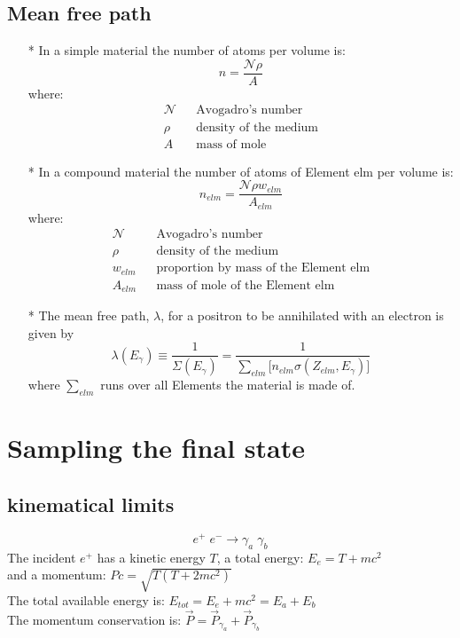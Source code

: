 \subsection{Mean free path}
\begin{itemize}
\item[*]
         In a simple material the number of atoms per volume is:
         \[n  = \frac{\mathcal{N}\rho}{A}\]
         where:
         \begin{eqnarray*}
          \mathcal{N} &  & \mbox{Avogadro's number} \\
          \rho        &  & \mbox{density of the medium} \\
          A           &  & \mbox{mass of mole} 
         \end{eqnarray*}
\item[*]
         In a compound material the number of atoms of Element elm per volume is:
         \[n_{elm}  = \frac{\mathcal{N}\rho w_{elm}}{A_{elm}}\]
         where:
         \begin{eqnarray*}
          \mathcal{N} &  & \mbox{Avogadro's number} \\
          \rho        &  & \mbox{density of the medium} \\
          w_{elm}     &  & \mbox{proportion by mass of the Element elm}\\
          A_{elm}     &  & \mbox{mass of mole of the Element elm} 
         \end{eqnarray*} 
\item[*] 
         The mean free path, $\lambda$, for a positron to be annihilated with
         an electron is given by
         \[
           \lambda(E_{\gamma}) \equiv \frac{1}{\Sigma (E_{\gamma})} 
             = \frac{1}{\sum_{elm}{\lbrack n_{elm} \sigma(Z_{elm},E_{\gamma})\rbrack}}
         \]
         where $\sum_{elm}$ runs over all Elements the material is made of.
\end{itemize}
 
\section {Sampling the final state}
\subsection{kinematical limits}
\[e^+ \; e^- \to \gamma_a \; \gamma_b \]
\noindent 
The incident $e^+$ has a kinetic energy $T$, a total energy: $E_e = T + mc^2$ \\
and a momentum: $Pc = \sqrt{T(T+2mc^2)}$ \\
The total available energy is: $E_{tot} = E_e + mc^2 = E_a + E_b$  \\
The momentum conservation is: $ \vec{P} = \vec{P}_{\gamma_a} + \vec{P}_{\gamma_b}$ 


